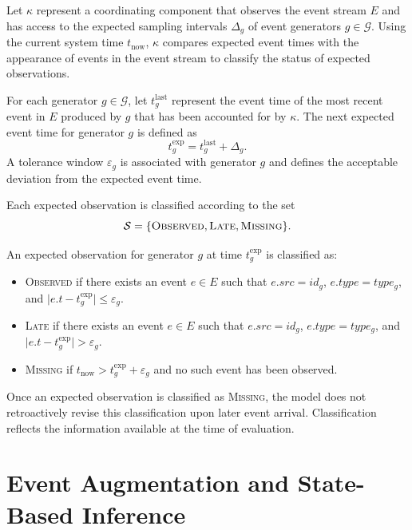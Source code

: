 Let $\kappa$ represent a coordinating component that observes the event stream $E$ and has access to the expected sampling intervals $\Delta_g$ of event
generators $g \in \mathcal{G}$. Using the current system time $t_{\mathrm{now}}$, $\kappa$ compares expected event times with the appearance of events in the event stream to classify the status of expected observations.

For each generator $g \in \mathcal{G}$, let $t^{\mathrm{last}}_g$ represent the event time of the most recent event in $E$ produced by $g$ that has been accounted for
by $\kappa$. The next expected event time for generator $g$ is defined as
\begin{equation}
t^{\mathrm{exp}}_g = t^{\mathrm{last}}_g + \Delta_g .
\end{equation}
A tolerance window $\varepsilon_g$ is associated with generator $g$ and defines the acceptable deviation from the expected event time.


Each expected observation is classified according to the set
\begin{equation}
\mathcal{S} = \{\textsc{Observed}, \textsc{Late}, \textsc{Missing}\}.
\end{equation}

An expected observation for generator $g$ at time $t^{\mathrm{exp}}_g$ is classified as:
\begin{itemize}
    \item \textsc{Observed} if there exists an event $e \in E$ such that
    $e.src = id_g$, $e.type = type_g$, and
    $\lvert e.t - t^{\mathrm{exp}}_g \rvert \le \varepsilon_g$.

    \item \textsc{Late} if there exists an event $e \in E$ such that
    $e.src = id_g$, $e.type = type_g$, and
    $\lvert e.t - t^{\mathrm{exp}}_g \rvert > \varepsilon_g$.

    \item \textsc{Missing} if $t_{\mathrm{now}} >
    t^{\mathrm{exp}}_g + \varepsilon_g$ and no such event has been observed.
\end{itemize}
\noindent
Once an expected observation is classified as \textsc{Missing}, the model does not retroactively revise this classification upon later event arrival. Classification
reflects the information available at the time of evaluation.


\section{Event Augmentation and State-Based Inference}
\label{sec:state-based-inference} %

